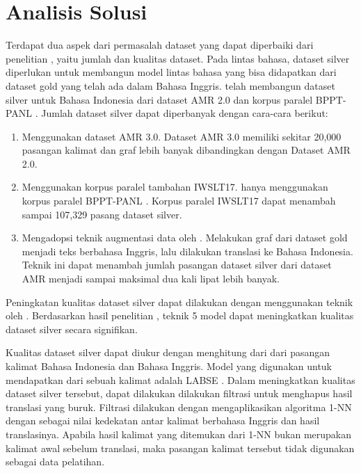 \section{Analisis Solusi}

Terdapat dua aspek dari permasalah dataset yang dapat diperbaiki dari penelitian \textcite{putra2022}, yaitu jumlah dan kualitas dataset.
Pada \amrparsing{} lintas bahasa, dataset silver diperlukan untuk membangun model \amrparsing{} lintas bahasa yang bisa didapatkan dari dataset gold yang telah ada dalam Bahasa Inggris.
\textcite{putra2022} telah membangun dataset silver untuk Bahasa Indonesia dari dataset AMR 2.0 dan korpus paralel BPPT-PANL .
Jumlah dataset silver dapat diperbanyak dengan cara-cara berikut:
\begin{enumerate}
  \item Menggunakan dataset AMR 3.0.
  Dataset AMR 3.0 memiliki sekitar 20,000 pasangan kalimat dan graf \AMR{} lebih banyak dibandingkan dengan Dataset AMR 2.0.

  \item Menggunakan korpus paralel tambahan IWSLT17.
  \textcite{putra2022} hanya menggunakan korpus paralel BPPT-PANL .
  Korpus paralel IWSLT17  dapat menambah sampai 107,329 pasang dataset silver.

  \item Mengadopsi teknik augmentasi data oleh \textcite{lee2022}.
  Melakukan  graf \AMR{} dari dataset gold menjadi teks berbahasa Inggris, lalu dilakukan translasi ke Bahasa Indonesia.
  Teknik ini dapat menambah jumlah pasangan dataset silver dari dataset AMR menjadi sampai maksimal dua kali lipat lebih banyak.
\end{enumerate}

Peningkatan kualitas dataset silver dapat dilakukan dengan menggunakan teknik  oleh \textcite{hoang2021}.
Berdasarkan hasil penelitian \textcite{lee2022}, teknik  5 model \amrparser{} dapat meningkatkan kualitas dataset silver secara signifikan.

Kualitas dataset silver dapat diukur dengan menghitung \cossim{} dari \multil{}  dari pasangan kalimat Bahasa Indonesia dan Bahasa Inggris.
Model \mwordem{} yang digunakan untuk mendapatkan \multil{}  dari sebuah kalimat adalah \gls{LABSE} .
Dalam meningkatkan kualitas dataset silver tersebut, dapat dilakukan dilakukan filtrasi untuk menghapus hasil translasi yang buruk.
Filtrasi dilakukan dengan mengaplikasikan algoritma \gls{1-NN} dengan \cossim{} sebagai nilai kedekatan antar kalimat berbahasa Inggris dan hasil translasinya.
Apabila hasil kalimat yang ditemukan dari \gls{1-NN} bukan merupakan kalimat awal sebelum translasi, maka pasangan kalimat tersebut tidak digunakan sebagai data pelatihan.

